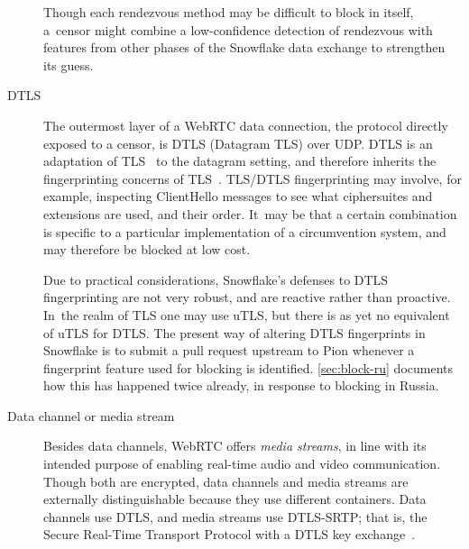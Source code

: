 \documentclass[letterpaper,twocolumn]{article}
\newcommand{\firstterm}[1]{\textit{#1}}
\begin{document}
\begin{description}
Though each rendezvous method may be difficult to block in itself,
a~censor might combine a low-confidence detection of rendezvous
with features from other phases of the Snowflake data exchange
to strengthen its guess.

\item[DTLS]
The outermost layer of a WebRTC data connection,
the protocol directly exposed to a censor,
is DTLS (Datagram TLS) over UDP.
DTLS is an adaptation of TLS~\cite[\S 1]{rfc9147} to the datagram setting,
and therefore inherits the fingerprinting concerns of TLS~\cite{Frolov2019a}.
TLS/DTLS fingerprinting may involve, for example,
inspecting ClientHello messages to see what
ciphersuites and extensions are used,
and their order. It~may be that a certain combination
is specific to a particular implementation of a circumvention system,
and may therefore be blocked at low cost.

Due to practical considerations,
Snowflake's defenses to DTLS fingerprinting are not very robust,
and are reactive rather than proactive.
In~the realm of TLS one may use uTLS,
but there is as yet no equivalent of uTLS for DTLS.
The present way of altering DTLS fingerprints in Snowflake
is to submit a pull request upstream to Pion
whenever a fingerprint feature used for blocking is identified.
\autoref{sec:block-ru} documents how this has happened twice already,
in response to blocking in Russia.

%

\item[Data channel or media stream]
Besides data channels, WebRTC offers \firstterm{media streams},
in line with its intended purpose of enabling real-time
audio and video communication.
Though both are encrypted,
data channels and media streams are externally distinguishable
because they use different containers.
Data channels use DTLS,
and media streams use DTLS-SRTP;
that is, the Secure Real-Time Transport Protocol
with a DTLS key exchange~\cite[\S 4.3]{rfc8827}.


\end{description}
\end{document}
